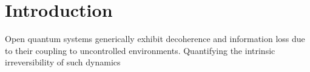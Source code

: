 \documentclass[pra,twocolumn,aps,showpacs,superscriptaddress,longbibliography]{revtex4-2}%
\providecommand{\DIFdel}[1]{{\protect\color{red} \scriptsize #1}} %
\providecommand{\DIFaddbegin}{} %
\providecommand{\DIFaddend}{} %
\providecommand{\DIFdelbegin}{} %
\providecommand{\DIFdelend}{} %
\begin{document}
\begin{abstract}
{We investigate the equilibration value of the Choi echo across the integrability-to-chaos transition in three paradigmatic spin-$1/2$ chains. We show that average single-spin decoherence does not uniquely correspond to spectral chaos. Specifically, coherent transport in integrable systems can mimic the mean relaxation of a single spin typically induced by chaotic scrambling, generating false positives for spectral chaos. This work offers a fresh perspective bridging quantum information tools with many-body quantum chaos}\DIFaddend .
\end{abstract}
\keywords{}
\pacs{}

\maketitle

\section{Introduction}
\DIFdelbegin \DIFdel{Open quantum systems generically exhibit decoherence and information loss due to their coupling to uncontrolled environments. Quantifying the intrinsic irreversibility of such dynamics }\DIFdelend \DIFaddbegin 
\end{document}
